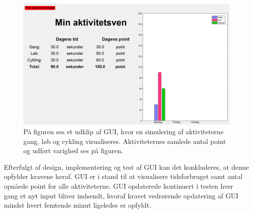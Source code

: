 \begin{figure}[H]
	\centering
	\includegraphics[scale=0.35]{figures/cDesign/test_GUI.png}
	\caption{På figuren ses et udklip af GUI, hvor en simulering af aktiviteterne gang, løb og cykling visualiseres. Aktiviteternes samlede antal point og udført varighed ses på figuren.}
	\label{fig:GUI2}
\end{figure}\vspace{-.5cm}
Efterfulgt af design, implementering og test af GUI kan det konkluderes, at denne opfylder kravene heraf. GUI er i stand til at visualisere tidsforbruget samt antal opnåede point for alle aktiviteterne. GUI opdaterede kontinuert i testen hver gang et nyt input bliver indsendt, hvoraf kravet vedrørende opdatering af GUI mindst hvert femtende minut ligeledes er opfyldt.
